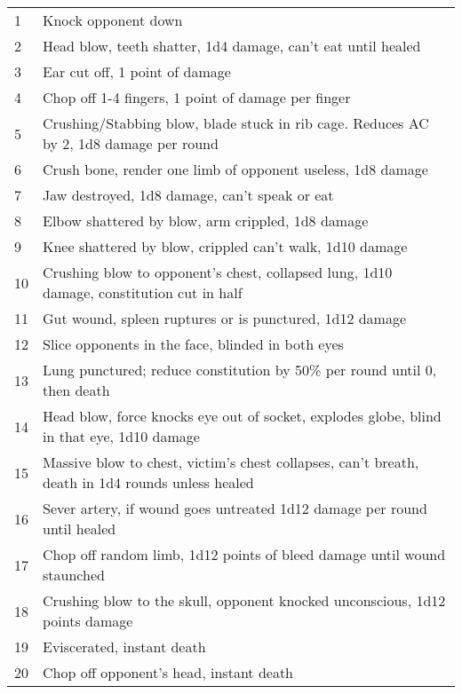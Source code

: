 \begin{tabular}{l l}
1 & Knock opponent down \\
2 & Head blow, teeth shatter, 1d4 damage, can't eat until healed\\
3 & Ear cut off, 1 point of damage\\
4 & Chop off 1-4 fingers, 1 point of damage per finger \\
5 & Crushing/Stabbing blow, blade stuck in rib cage. Reduces AC by 2, 1d8 damage per round \\
6 & Crush bone, render one limb of opponent useless, 1d8 damage\\
7 & Jaw destroyed, 1d8 damage, can’t speak or eat \\
8 & Elbow shattered by blow, arm crippled, 1d8 damage\\
9 & Knee shattered by blow, crippled can’t walk, 1d10 damage \\
10 & Crushing blow to opponent’s chest, collapsed lung, 1d10 damage, constitution cut in half \\
11 & Gut wound, spleen ruptures or is punctured, 1d12 damage\\
12 & Slice opponents in the face, blinded in both eyes \\
13 & Lung punctured; reduce constitution by 50\% per round until 0, then death \\
14 & Head blow, force knocks eye out of socket, explodes globe, blind in that eye, 1d10 damage \\
15 & Massive blow to chest, victim’s chest collapses, can’t breath, death in 1d4 rounds unless healed \\
16 & Sever artery, if wound goes untreated 1d12 damage per round until healed \\
17 & Chop off random limb, 1d12 points of bleed damage until wound staunched
 \\
18 & Crushing blow to the skull, opponent knocked unconscious, 1d12 points damage \\
19 & Eviscerated, instant death \\
20 & Chop off opponent’s head, instant death \\

\end{tabular}

